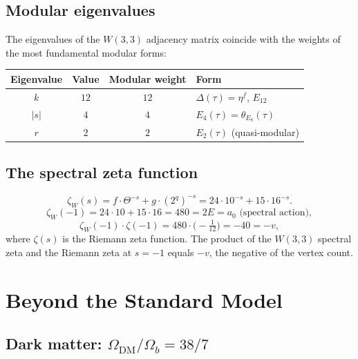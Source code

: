 \documentclass[12pt,a4paper]{article}
\theoremstyle{definition}
\begin{document}
\subsection{Modular eigenvalues}

The eigenvalues of the $W(3,3)$ adjacency matrix coincide with
the weights of the most fundamental modular forms:
\begin{center}
\begin{tabular}{cccl}
\toprule
Eigenvalue & Value & Modular weight & Form \\
\midrule
$k$ & $12$ & $12$ & $\Delta(\tau)=\eta^f$, $E_{12}$ \\
$|s|$ & $4$ & $4$ & $E_4(\tau)=\theta_{E_8}(\tau)$ \\
$r$ & $2$ & $2$ & $E_2(\tau)$ (quasi-modular) \\
\bottomrule
\end{tabular}
\end{center}

\subsection{The spectral zeta function}

\begin{equation}
  \zeta_W(s) = f\cdot\Theta^{-s} + g\cdot(2^q)^{-s}
             = 24\cdot 10^{-s} + 15\cdot 16^{-s}.
\end{equation}
\begin{equation}
  \zeta_W(-1) = 24\cdot 10 + 15\cdot 16 = 480 = 2E = a_0\text{ (spectral action)},
\end{equation}
\begin{equation}
  \zeta_W(-1)\cdot\zeta(-1) = 480\cdot\bigl(-\tfrac{1}{12}\bigr) = -40 = -v,
\end{equation}
where $\zeta(s)$ is the Riemann zeta function.
The product of the $W(3,3)$ spectral zeta and the Riemann zeta at $s=-1$
equals $-v$, the negative of the vertex count.


\section{Beyond the Standard Model}
\label{sec:bsm}

\subsection{Dark matter: \texorpdfstring{$\Omega_{\mathrm{DM}}/\Omega_b=38/7$}{}}
\end{document}
